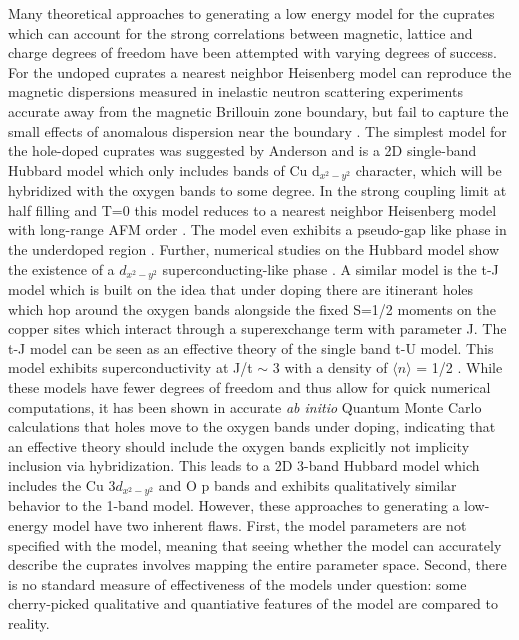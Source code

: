 \documentclass{article}
\begin{document}
Many theoretical approaches to generating a low energy model for the cuprates which can account for the strong correlations between magnetic, lattice and charge degrees of freedom have been attempted with varying degrees of success. 
For the undoped cuprates a nearest neighbor Heisenberg model can reproduce the magnetic dispersions measured in inelastic neutron scattering experiments accurate away from the magnetic Brillouin zone boundary, but fail to capture the small effects of anomalous dispersion near the boundary \cite{PhysRevB.79.155114, PhysRevLett.75.553}. 
The simplest model for the hole-doped cuprates was suggested by Anderson and is a 2D single-band Hubbard model which only includes bands of Cu d$_{x^2-y^2}$ character, which will be hybridized with the oxygen bands to some degree. 
In the strong coupling limit at half filling and T=0 this model reduces to a nearest neighbor Heisenberg model with long-range AFM order \cite{doi:10.1139/p78-120, PhysRevB.38.316}.
The model even exhibits a pseudo-gap like phase in the underdoped region \cite{PhysRevLett.94.156404,PhysRevB.74.024508}. 
Further, numerical studies on the Hubbard model show the existence of a $d_{x^2-y^2}$ superconducting-like phase \cite{PhysRevB.81.224505, PhysRevB.70.054504}. 
A similar model is the t-J model  which is built on the idea that under doping there are itinerant holes which hop around the oxygen bands alongside the fixed S=1/2 moments on the copper sites which interact through a superexchange term with parameter J. 
The t-J model can be seen as an effective theory of the single band t-U model. 
This model exhibits superconductivity at J/t $\sim$ 3 with a density of $\langle n \rangle$ = 1/2 \cite{PhysRevB.45.5744, PhysRevLett.70.682}.
While these models have fewer degrees of freedom and thus allow for quick numerical computations, it has been shown in accurate \textit{ab initio} Quantum Monte Carlo calculations that holes move to the oxygen bands under doping, indicating that an effective theory should include the oxygen bands explicitly not implicity inclusion via hybridization. 
This leads to a 2D 3-band Hubbard model which includes the Cu 3$d_{x^2-y^2}$ and O p bands \cite{PhysRevLett.58.2794, VARMA1987681} and exhibits qualitatively similar behavior to the 1-band model. 
However, these approaches to generating a low-energy model have two inherent flaws. 
First, the model parameters are not specified with the model, meaning that seeing whether the model can accurately describe the cuprates involves mapping the entire parameter space. 
Second, there is no standard measure of effectiveness of the models under question: some cherry-picked qualitative and quantiative features of the model are compared to reality.
\end{document}
